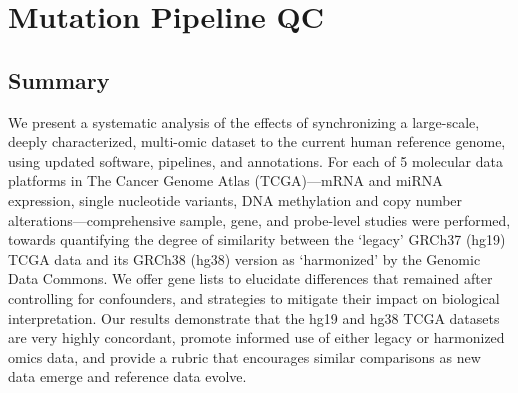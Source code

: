 \chapter{Mutation Pipeline QC}
\label{chap:mut-pipeline-qc}


\section{Summary}
We present a systematic analysis of the effects of synchronizing a large-scale, deeply characterized, multi-omic dataset to the current human reference genome, using updated software, pipelines, and annotations.
For each of 5 molecular data platforms in The Cancer Genome Atlas (TCGA)---mRNA and miRNA expression, single nucleotide variants, DNA methylation and copy number alterations---comprehensive sample, gene, and probe-level studies were performed, towards quantifying the degree of similarity between the \enquote*{legacy} GRCh37 (hg19) TCGA data and its GRCh38 (hg38) version as \enquote*{harmonized} by the Genomic Data Commons.
We offer gene lists to elucidate differences that remained after controlling for confounders, and strategies to mitigate their impact on biological interpretation.
Our results demonstrate that the hg19 and hg38 TCGA datasets are very highly concordant, promote informed use of either legacy or harmonized omics data, and provide a rubric that encourages similar comparisons as new data emerge and reference data evolve.


